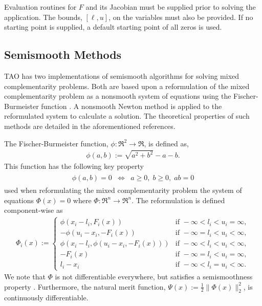 Evaluation routines for $F$ and its Jacobian must be supplied prior
to solving the application.
The bounds, $[\ell,u]$, on the variables must also be 
provided.  
If no starting point is supplied, a default starting point of all zeros 
is used.

\subsection{Semismooth Methods}

TAO has two implementations of semismooth algorithms 
\cite{munson.facchinei.ea:semismooth, deluca.facchinei.ea:semismooth, 
facchinei.fischer.ea:semismooth} for solving mixed complementarity problems.
Both are based upon a reformulation of the mixed complementarity problem
as a nonsmooth system of equations using the Fischer-Burmeister 
function \cite{fischer:special}.  A nonsmooth Newton method is applied to
the reformulated system to calculate a solution.  The theoretical properties
of such methods are detailed in the aforementioned references.

The Fischer-Burmeister function, $\phi:\Re^2 \to \Re$, is defined as,
\begin{eqnarray*}
\phi(a,b) := \sqrt{a^2 + b^2} - a - b.
\end{eqnarray*}
This function has the following key property
\begin{eqnarray*}
\begin{array}{lcr}
        \phi(a,b) = 0 & \Leftrightarrow & a \geq 0,\; b \geq 0,\; ab = 0
\end{array}
\end{eqnarray*}
used when reformulating the mixed complementarity problem the system of 
equations $\Phi(x) = 0$ where $\Phi:\Re^n \to \Re^n$.  
The reformulation is defined component-wise as
\begin{eqnarray*}
\Phi_i(x) := \left\{ \begin{array}{ll}
   \phi(x_i - l_i, F_i(x)) & \mbox{if } -\infty < l_i < u_i = \infty, \\
   -\phi(u_i-x_i, -F_i(x)) & \mbox{if } -\infty = l_i < u_i < \infty, \\
   \phi(x_i - l_i, \phi(u_i - x_i, - F_i(x))) & \mbox{if } -\infty < l_i < u_i < \infty, \\
   -F_i(x) & \mbox{if } -\infty = l_i < u_i = \infty, \\
   l_i - x_i & \mbox{if } -\infty < l_i = u_i < \infty.
   \end{array} \right.
\end{eqnarray*}
We note that $\Phi$ is not differentiable everywhere, but satisfies a
semismoothness property 
\cite{mifflin:semismooth, qi:convergence, qi.sun:nonsmooth}.  Furthermore,
the natural merit function, $\Psi(x) := \frac{1}{2} \| \Phi(x) \|_2^2$, is 
continuously differentiable.

